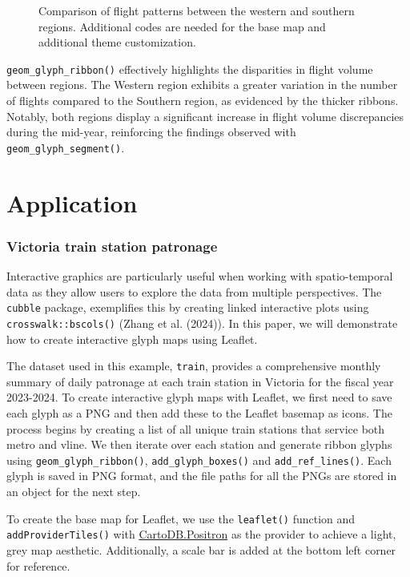 \begin{figure}
\centering
{}
\caption{\label{fig:unnamed-chunk-21}Comparison of flight patterns between the western and southern regions. Additional codes are needed for the base map and additional theme customization.}
\end{figure}

\texttt{geom\_glyph\_ribbon()} effectively highlights the disparities in flight volume between regions. The Western region exhibits a greater variation in the number of flights compared to the Southern region, as evidenced by the thicker ribbons. Notably, both regions display a significant increase in flight volume discrepancies during the mid-year, reinforcing the findings observed with \texttt{geom\_glyph\_segment()}.

\section{Application}\label{application}

\subsubsection{Victoria train station patronage}\label{victoria-train-station-patronage}

Interactive graphics are particularly useful when working with spatio-temporal data as they allow users to explore the data from multiple perspectives. The \texttt{cubble} package, exemplifies this by creating linked interactive plots using \texttt{crosswalk::bscols()} (Zhang et al. (2024)). In this paper, we will demonstrate how to create interactive glyph maps using Leaflet.

The dataset used in this example, \texttt{train}, provides a comprehensive monthly summary of daily patronage at each train station in Victoria for the fiscal year 2023-2024. To create interactive glyph maps with Leaflet, we first need to save each glyph as a PNG and then add these to the Leaflet basemap as icons. The process begins by creating a list of all unique train stations that service both metro and vline. We then iterate over each station and generate ribbon glyphs using \texttt{geom\_glyph\_ribbon()}, \texttt{add\_glyph\_boxes()} and \texttt{add\_ref\_lines()}. Each glyph is saved in PNG format, and the file paths for all the PNGs are stored in an object for the next step.

To create the base map for Leaflet, we use the \texttt{leaflet()} function and \texttt{addProviderTiles()} with \href{https://github.com/CartoDB/basemap-styles}{CartoDB.Positron} as the provider to achieve a light, grey map aesthetic. Additionally, a scale bar is added at the bottom left corner for reference.

